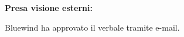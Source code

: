 \vspace*{\fill}
\begin{flushright}
    \textbf{Presa visione esterni:}

    \vspace{1cm}
    Bluewind ha approvato il verbale tramite e-mail.
    \vspace{0.5cm}
\end{flushright}